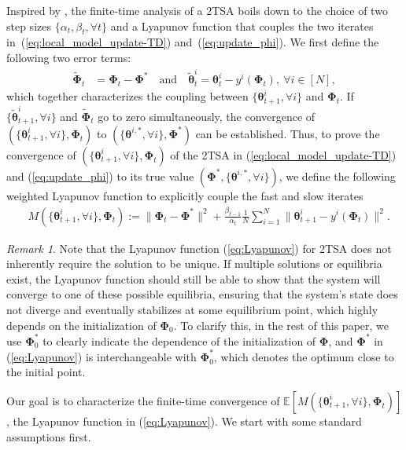 \documentclass{article} %
\def\eqref#1{equation~\ref{#1}}
\theoremstyle{plain}
\theoremstyle{definition}
\theoremstyle{remark}
\newtheorem{remark}[theorem]{Remark}
\renewcommand{\eqref}[1]{(\ref{#1})}
\begin{document}
 Inspired by \cite{doan2022nonlinear}, the finite-time analysis of a 2TSA boils down to the choice of two step sizes $\{\alpha_t, \beta_t, \forall t\}$ and a Lyapunov function that couples the two iterates in~\eqref{eq:local_model_update-TD} and~\eqref{eq:update_phi}.  We first define the following two error terms: 
\begin{align}\label{eq:residual}
    \tilde{\pmb{\Phi}}_t&=\pmb{\Phi}_t-{\pmb{\Phi}}^* \quad \text{and} \quad 
    \tilde{\pmb{\theta}}^i_t=\pmb{\theta}^i_t-y^i(\pmb{\Phi}_{t}),~ \forall i\in[N],
\end{align}
which together characterizes the coupling between $\{\pmb{\theta}^i_{t+1}, \forall i\}$ and $\pmb{\Phi}_t$. 
%
If $\{\tilde{\pmb{\theta}}^i_{t+1}, \forall i\}$ and $\tilde{\pmb{\Phi}}_t$ go to zero simultaneously, the convergence of $(\{\pmb{\theta}_{t+1}^i, \forall i\},\pmb{\Phi}_t)$ to $(\{\pmb{\theta}^{i,*}, \forall i\},\pmb{\Phi}^*)$ can be established. 
%
Thus, to prove the convergence of $(\{\pmb{\theta}_{t+1}^i, \forall i\},\pmb{\Phi}_t)$ of the 2TSA in \eqref{eq:local_model_update-TD} and \eqref{eq:update_phi} to its true value $({\pmb{\Phi}}^*,\{\pmb{\theta}^{i,*}, \forall i\})$,  we define the following weighted Lyapunov function to explicitly couple the fast and slow iterates 
\begin{align}\label{eq:Lyapunov}
   & M(\{\pmb{\theta}^i_{t+1}, \forall i\},\pmb{\Phi}_t):=\|\pmb{\Phi}_t-\pmb{\Phi}^*\|^2+\frac{\beta_{t-1}}{\alpha_t} \frac{1}{N}\sum_{i=1}^N\|\pmb{\theta}_{t+1}^i-y^i(\pmb{\Phi}_{t})\|^2.
\end{align}
\begin{remark}
    Note that the Lyapunov function \eqref{eq:Lyapunov} for 2TSA does not inherently require the solution to be unique. If multiple solutions or equilibria exist, the Lyapunov function should still be able to show that the system will converge to one of these possible equilibria, ensuring that the system's state does not diverge and eventually stabilizes at some equilibrium point, which highly depends on the initialization of $\pmb{\Phi}_0$.  To clarify this, in the rest of this paper,  we use $\pmb{\Phi}^*_0$
 to clearly indicate the dependence of the initialization of $\pmb{\Phi}$, and  $\pmb{\Phi}^*$ in \eqref{eq:Lyapunov} is interchangeable with $\pmb{\Phi}_0^*$, which denotes the optimum close to the initial point.
\end{remark}
Our goal is to characterize the finite-time convergence of $\mathbb{E}[M(\{\pmb{\theta}^i_{t+1}, \forall i\},\pmb{\Phi}_t)]$, the Lyapunov function in \eqref{eq:Lyapunov}. We start with some standard assumptions first. 
\end{document}

